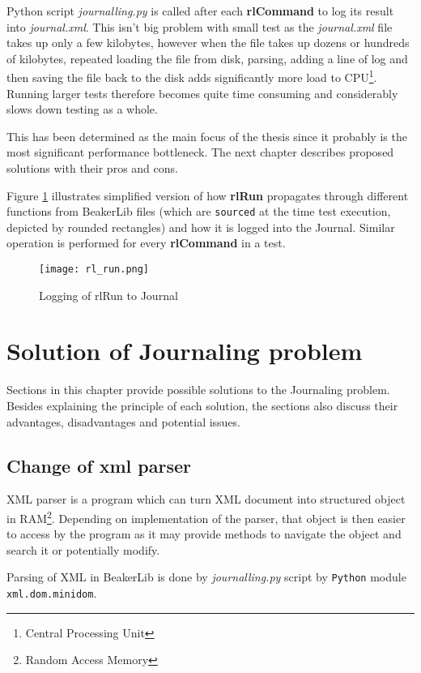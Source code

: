 Python script \textit{journalling.py} is called after each \textbf{rlCommand} to log its result into \textit{journal.xml}. This isn't big problem with small test as the \textit{journal.xml} file takes up only a few kilobytes, however when the file takes up dozens or hundreds of kilobytes, repeated loading the file from disk, parsing, adding a line of log and then saving the file back to the disk adds significantly more load to CPU\footnote{Central Processing Unit}. Running larger tests therefore becomes quite time consuming and considerably slows down testing as a whole.

This has been determined as the main focus of the thesis since it probably is the most significant performance bottleneck. The next chapter describes proposed solutions with their pros and cons.

Figure \ref{fig:rl_run} illustrates simplified version of how \textbf{rlRun} propagates through different functions from BeakerLib files (which are \texttt{sourced} at the time test execution,  depicted by rounded rectangles) and how it is logged into the Journal. Similar operation is performed for every \textbf{rlCommand} in a test.

\begin{figure}[h!]
  \texttt{[image: rl\_run.png]}
  \caption{Logging of rlRun to Journal}
  \label{fig:rl_run}
\end{figure}

\chapter{Solution of Journaling problem}
\label{solutions}

Sections in this chapter provide possible solutions to the Journaling problem. Besides explaining the principle of each solution, the sections also discuss their advantages, disadvantages and potential issues.

\section{Change of xml parser}
XML parser is a program which can turn XML document into structured object in RAM\footnote{Random Access Memory}. Depending on implementation of the parser, that object is then easier to access by the program as it may provide methods to navigate the object and search it or potentially modify. 

Parsing of XML in BeakerLib is done by \textit{journalling.py} script by \texttt{Python} module \texttt{xml.dom.minidom}\cite{minidom_doc}. 

